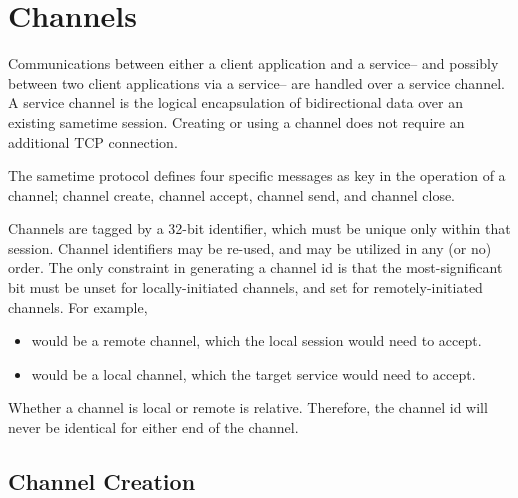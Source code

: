 

\chapter{Channels}

\par{} Communications between either a client application and a
service-- and possibly between two client applications via a service--
are handled over a service channel. A service channel is the logical
encapsulation of bidirectional data over an existing sametime
session. Creating or using a channel does not require an additional
TCP connection.

\par{} The sametime protocol defines four specific messages as key in
the operation of a channel; channel create, channel accept, channel
send, and channel close.

\par{} Channels are tagged by a 32-bit identifier, which must be
unique only within that session. Channel identifiers may be re-used,
and may be utilized in any (or no) order. The only constraint in
generating a channel id is that the most-significant bit must be unset
for locally-initiated channels, and set for remotely-initiated
channels. For example,

\begin{itemize}
\item {} would be a remote channel, which the local
session would need to accept.
\item {} would be a local channel, which the target
service would need to accept.
\end{itemize}

\par{} Whether a channel is local or remote is relative. Therefore,
the channel id will never be identical for either end of the channel.


\section{Channel Creation}

